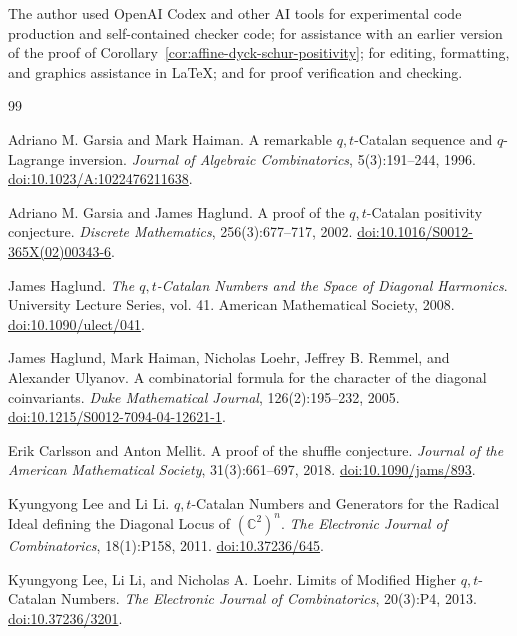 \documentclass[11pt]{article}
\theoremstyle{plain}
\theoremstyle{definition}
\theoremstyle{remark}
\begin{document}
The author used OpenAI Codex and other AI tools for experimental code
production and self-contained checker code; for assistance with an earlier
version of the proof of
Corollary~\ref{cor:affine-dyck-schur-positivity}; for editing, formatting, and
graphics assistance in \LaTeX; and for proof verification and checking.
\begin{thebibliography}{99}
\raggedright
{}
Adriano M. Garsia and Mark Haiman.
\newblock A remarkable \(q,t\)-Catalan sequence and \(q\)-Lagrange inversion.
\newblock \emph{Journal of Algebraic Combinatorics}, 5(3):191--244, 1996.
\newblock \href{https://doi.org/10.1023/A:1022476211638}{doi:10.1023/A:1022476211638}.

Adriano M. Garsia and James Haglund.
\newblock A proof of the \(q,t\)-Catalan positivity conjecture.
\newblock \emph{Discrete Mathematics}, 256(3):677--717, 2002.
\newblock \href{https://doi.org/10.1016/S0012-365X(02)00343-6}{doi:10.1016/S0012-365X(02)00343-6}.

James Haglund.
\newblock \emph{The \(q,t\)-Catalan Numbers and the Space of Diagonal
Harmonics}.
\newblock University Lecture Series, vol. 41. American Mathematical Society,
2008.
\newblock \href{https://doi.org/10.1090/ulect/041}{doi:10.1090/ulect/041}.

James Haglund, Mark Haiman, Nicholas Loehr, Jeffrey B. Remmel, and
Alexander Ulyanov.
\newblock A combinatorial formula for the character of the diagonal
coinvariants.
\newblock \emph{Duke Mathematical Journal}, 126(2):195--232, 2005.
\newblock \href{https://doi.org/10.1215/S0012-7094-04-12621-1}{doi:10.1215/S0012-7094-04-12621-1}.

Erik Carlsson and Anton Mellit.
\newblock A proof of the shuffle conjecture.
\newblock \emph{Journal of the American Mathematical Society}, 31(3):661--697,
2018.
\newblock \href{https://doi.org/10.1090/jams/893}{doi:10.1090/jams/893}.

Kyungyong Lee and Li Li.
\newblock \(q,t\)-Catalan Numbers and Generators for the Radical Ideal
defining the Diagonal Locus of \((\mathbb C^2)^n\).
\newblock \emph{The Electronic Journal of Combinatorics}, 18(1):P158, 2011.
\newblock \href{https://doi.org/10.37236/645}{doi:10.37236/645}.

Kyungyong Lee, Li Li, and Nicholas A. Loehr.
\newblock Limits of Modified Higher \(q,t\)-Catalan Numbers.
\newblock \emph{The Electronic Journal of Combinatorics}, 20(3):P4, 2013.
\newblock \href{https://doi.org/10.37236/3201}{doi:10.37236/3201}.


\end{thebibliography}
\end{document}
